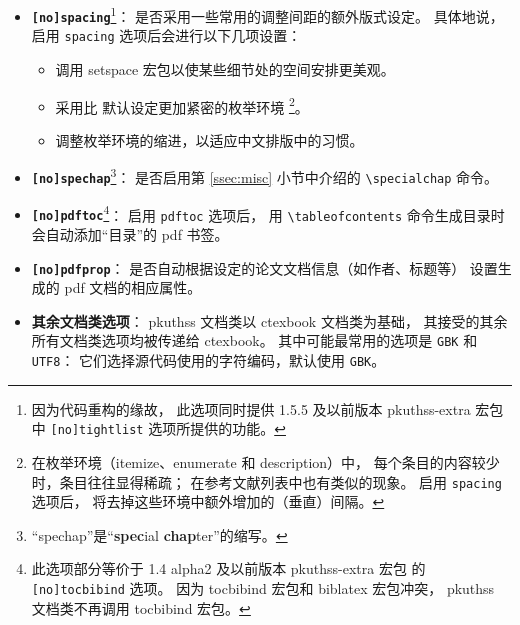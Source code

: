 \begin{itemize}
  \item \textbf{\texttt{[no]spacing}}\footnote{%
      因为代码重构的缘故，
      此选项同时提供 1.5.5 及以前版本 pkuthss-extra 宏包
      中 \texttt{[no]tightlist} 选项所提供的功能。%
    }：
    是否采用一些常用的调整间距的额外版式设定。
    具体地说，启用 \verb|spacing| 选项后会进行以下几项设置：
  \begin{itemize}
    \item 调用 setspace 宏包以使某些细节处的空间安排更美观。
    \item 采用比  默认设定更加紧密的枚举环境%
      \footnote{%
        在枚举环境（itemize、enumerate 和 description）中，
        每个条目的内容较少时，条目往往显得稀疏；
        在参考文献列表中也有类似的现象。
        启用 \texttt{spacing} 选项后，
        将去掉这些环境中额外增加的（垂直）间隔。%
      }。
    \item 调整枚举环境的缩进，以适应中文排版中的习惯。
  \end{itemize}

  \item \textbf{\texttt{[no]spechap}}\footnote{%
      “spechap”是“\textbf{spec}ial \textbf{chap}ter”的缩写。%
    }：
    是否启用第 \ref{ssec:misc} 小节中介绍的 \verb|\specialchap| 命令。

  \item \textbf{\texttt{[no]pdftoc}}\footnote{%
      此选项部分等价于 1.4 alpha2 及以前版本 pkuthss-extra 宏包
      的 \texttt{[no]tocbibind} 选项。
      因为 tocbibind 宏包和 biblatex 宏包冲突，%
      pkuthss 文档类不再调用 tocbibind 宏包。%
    }：
    启用 \verb|pdftoc| 选项后，
    用 \verb|\tableofcontents| 命令生成目录时会自动添加“目录”的 pdf 书签。

  \item \textbf{\texttt{[no]pdfprop}}：
    是否自动根据设定的论文文档信息（如作者、标题等）
    设置生成的 pdf 文档的相应属性。

  \item \textbf{其余文档类选项}：%
    pkuthss 文档类以 ctexbook 文档类为基础，
    其接受的其余所有文档类选项均被传递给 ctexbook。
    其中可能最常用的选项是 \verb|GBK| 和 \verb|UTF8|：
    它们选择源代码使用的字符编码，默认使用 \verb|GBK|。
\end{itemize}

